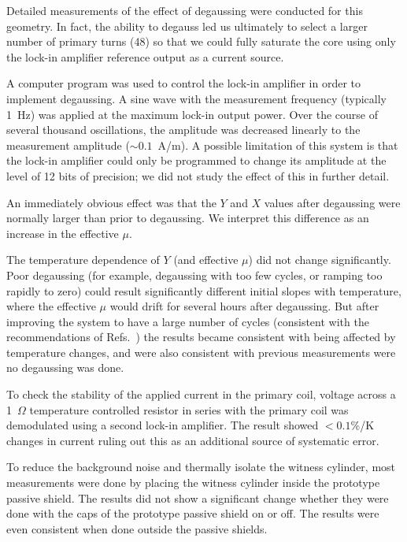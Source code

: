 Detailed measurements of the effect of degaussing were conducted for
this geometry.  In fact, the ability to degauss led us ultimately to
select a larger number of primary turns (48) so that we could fully
saturate the core using only the lock-in amplifier reference output as
a current source.

A computer program was used to control the lock-in amplifier in order
to implement degaussing.  A sine wave with the measurement frequency
(typically 1~Hz) was applied at the maximum lock-in output power.
Over the course of several thousand oscillations, the amplitude was
decreased linearly to the measurement amplitude ($\sim 0.1$~A/m).  A
possible limitation of this system is that the lock-in amplifier could
only be programmed to change its amplitude at the level of 12 bits of
precision; we did not study the effect of this in further detail.

An immediately obvious effect was that the $Y$ and $X$ values after
degaussing were normally larger than prior to degaussing.  We
interpret this difference as an increase in the effective $\mu$.

The temperature dependence of $Y$ (and effective $\mu$) did not change
significantly.  Poor degaussing (for example, degaussing with too few
cycles, or ramping too rapidly to zero) could result significantly
different initial slopes with temperature, where the effective $\mu$
would drift for several hours after degaussing.  But after improving
the system to have a large number of cycles (consistent with the
recommendations of Refs.~\cite{bib:thiel}) the results became
consistent with being affected by temperature changes, and were also
consistent with previous measurements were no degaussing was done.

To check the stability of the applied current in the primary coil,
voltage across a 1~$\Omega$ temperature controlled resistor in series
with the primary coil was demodulated using a second lock-in
amplifier.  The result showed $<0.1$\%/K changes in current ruling out
this as an additional source of systematic error.

To reduce the background noise and thermally isolate the witness
cylinder, most measurements were done by placing the witness cylinder
inside the prototype passive shield.  The results did not show a
significant change whether they were done with the caps of the
prototype passive shield on or off.  The results were even consistent
when done outside the passive shields.


